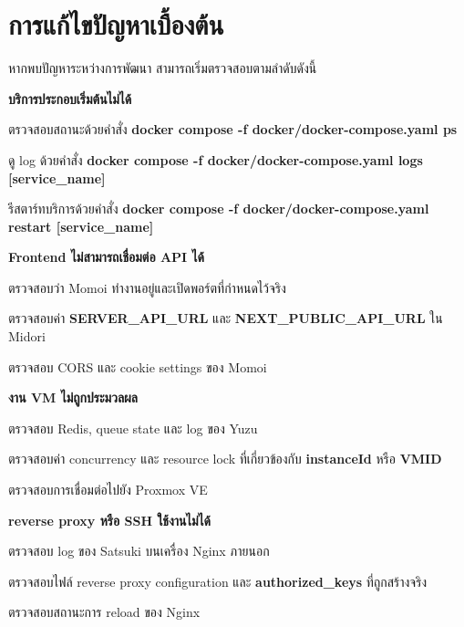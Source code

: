 \section{การแก้ไขปัญหาเบื้องต้น}
\hspace*{1.3em}
หากพบปัญหาระหว่างการพัฒนา สามารถเริ่มตรวจสอบตามลำดับดังนี้

\begin{mycustomenum2}
    \item \textbf{บริการประกอบเริ่มต้นไม่ได้}
    \begin{mycustomenum2}
        \item ตรวจสอบสถานะด้วยคำสั่ง \textbf{docker compose -f docker/docker-compose.yaml ps}
        \item ดู log ด้วยคำสั่ง \textbf{docker compose -f docker/docker-compose.yaml logs [service\_name]}
        \item รีสตาร์ทบริการด้วยคำสั่ง \textbf{docker compose -f docker/docker-compose.yaml restart [service\_name]}
    \end{mycustomenum2}
    \item \textbf{Frontend ไม่สามารถเชื่อมต่อ API ได้}
    \begin{mycustomenum2}
        \item ตรวจสอบว่า Momoi ทำงานอยู่และเปิดพอร์ตที่กำหนดไว้จริง
        \item ตรวจสอบค่า \textbf{SERVER\_API\_URL} และ \textbf{NEXT\_PUBLIC\_API\_URL} ใน Midori
        \item ตรวจสอบ CORS และ cookie settings ของ Momoi
    \end{mycustomenum2}
    \item \textbf{งาน VM ไม่ถูกประมวลผล}
    \begin{mycustomenum2}
        \item ตรวจสอบ Redis, queue state และ log ของ Yuzu
        \item ตรวจสอบค่า concurrency และ resource lock ที่เกี่ยวข้องกับ \textbf{instanceId} หรือ \textbf{VMID}
        \item ตรวจสอบการเชื่อมต่อไปยัง Proxmox VE
    \end{mycustomenum2}
    \item \textbf{reverse proxy หรือ SSH ใช้งานไม่ได้}
    \begin{mycustomenum2}
        \item ตรวจสอบ log ของ Satsuki บนเครื่อง Nginx ภายนอก
        \item ตรวจสอบไฟล์ reverse proxy configuration และ \textbf{authorized\_keys} ที่ถูกสร้างจริง
        \item ตรวจสอบสถานะการ reload ของ Nginx
    \end{mycustomenum2}
\end{mycustomenum2}
